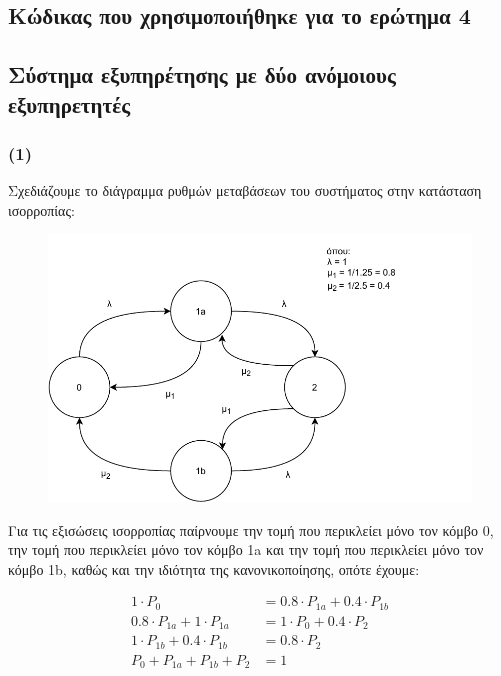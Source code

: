 \documentclass[a4paper]{article}
\begin{document}
\subsection*{Κώδικας που χρησιμοποιήθηκε για το ερώτημα 4}



\subsection*{Σύστημα εξυπηρέτησης με δύο ανόμοιους εξυπηρετητές}

\subsubsection*{(1)}

Σχεδιάζουμε το διάγραμμα ρυθμών μεταβάσεων του συστήματος στην κατάσταση ισορροπίας:

\begin{figure}[H]
	\includegraphics[width=\textwidth]{transition_diagram_2.pdf}
\end{figure}

Για τις εξισώσεις ισορροπίας παίρνουμε την τομή που περικλείει μόνο τον κόμβο 0, την τομή που περικλείει μόνο τον κόμβο 1a και την τομή που περικλείει μόνο τον κόμβο 1b, καθώς και την ιδιότητα της κανονικοποίησης, οπότε έχουμε: 

\begin{align}
	1 \cdot P_0 &= 0.8 \cdot P_{1a} + 0.4 \cdot P_{1b}	\\
	0.8 \cdot P_{1a} + 1 \cdot P_{1a} &= 1 \cdot P_0 + 0.4 \cdot P_2 \\
	1 \cdot P_{1b} + 0.4 \cdot P_{1b} &= 0.8 \cdot P_2	\\
	P_0 + P_{1a} + P_{1b} + P_{2} &= 1	 
\end{align}
\end{document}
